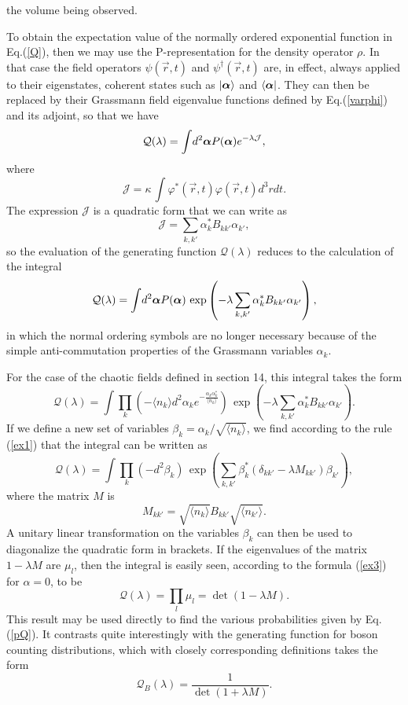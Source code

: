 \documentclass[12pt]{article}
\def\beq{\begin{equation}}
\def\eeq{\end{equation}}
\def\a{\alpha}
\def\ba{{\mbox{\boldmath$\alpha$}}}
\def\sa{\alpha^*}
\def\b{\beta}
\def\d{\delta}
\def\dgr{\dagger}
\def\eissp{eigenstates}
\def\eivs{eigenvalues }
\def\costs{coherent states }
\def\dop{density operator }
\begin{document}
the volume being observed.
\par
To obtain the expectation value of the 
normally ordered exponential function in Eq.(\ref {Q}),
then we may use the P-representation for the \dop $ \rho $.
In that case the field operators $ \psi ( \vec r , t ) $  
and $ \psi^\dgr ( \vec r , t ) $ are, in effect,
always applied to their \eissp, \costs such as $ | \ba \rangle $
and $ \langle \ba | $.  They can then be replaced
by their Grassmann field eigenvalue functions defined
by Eq.(\ref {varphi}) and its adjoint, so that
we have 
\beq
\mathcal{Q} ( \lambda ) = \int \! d^2 \ba P( \ba ) 
e ^ { - \lambda \mathcal{ J } } ,
\label {QJ}
\eeq
where 
\beq
\mathcal{ J } =  \kappa \, 
\int \! \varphi^* ( \vec r , t ) \varphi ( \vec r , t )
d^3r dt .
\label {Jk}
\eeq
The expression $ \mathcal{ J } $ is a quadratic form
that we can write as
\beq
\mathcal{ J } = \sum_{k, k'} \sa_k B_{ k k' } \a_{ k' } ,
\label { Jaa }
\eeq
so the evaluation of the generating function 
$ \mathcal{Q} ( \lambda ) $ reduces to the
calculation of the integral
\beq
\mathcal{ Q } ( \lambda ) = \int \! d^2 \ba P( \ba )
\, \exp \left( - \lambda \sum_{k, k'} \sa_k B_{ k k' } \a_{ k' }
\right) ,
\label {QB}
\eeq
in which the normal ordering symbols are no longer
necessary because of the simple anti-commutation
properties of the Grassmann variables $ \a_k $\@.
\par
For the case of the chaotic fields defined
in section 14,
this integral takes the form
\beq
\mathcal{ Q } ( \lambda ) = 
\int \! \prod_k \left( - \langle n_k \rangle d^2 \a_k
e^ { - \frac{ \a_k \sa_k }{ \langle n_k \rangle } } \right)
\, \exp \left( - \lambda \sum_{k, k'} \sa_k B_{ k k' } \a_{ k' }
\right) .
\label {Qch}
\eeq
If we define a new set of variables
$ \beta_k = \a_k / \sqrt{ \langle n_k \rangle } $,
we find according to the rule (\ref {ex1})
that the integral can be written as 
\beq
\mathcal{ Q } ( \lambda ) =
\int \! \prod_k ( - d^2 \b_k ) \,
\exp \left( \sum_{k, k'} \b^*_k
\left( \d_{ k k' } - \lambda M_{ k k' } \right) \b_{ k' }
\right) ,
\label {QBM}
\eeq
where the matrix $ M $ is
\beq
M_{ k k' } = \sqrt{ \langle n_k \rangle }
B_{ k k' } \sqrt{ \langle n_{ k' } \rangle } .
\label {MB}
\eeq
A unitary linear transformation
on the variables $ \b_k $ can then be used
to diagonalize the quadratic form in brackets.
If the \eivs of the matrix 
$ 1 - \lambda M $  are $ \mu_l $,
then the integral is easily seen,
according to the formula (\ref {ex3})
for $ \a = 0 $, to be
\beq
\mathcal{ Q } ( \lambda ) =
\prod_l \mu_l = \det \left( 1 - \lambda M \right) .
\label {Q1mM}
\eeq
This result may be used directly to find
the various probabilities given by Eq.(\ref {pQ}).
It contrasts quite interestingly
with the generating function
for boson counting distributions,
which with closely corresponding definitions
takes the form~\cite{GDW}
\beq
\mathcal{ Q }_B ( \lambda ) =
\frac { 1 }{ \det \left( 1 + \lambda M \right) } .
\label {Qb}
\eeq
  
\end{document}

